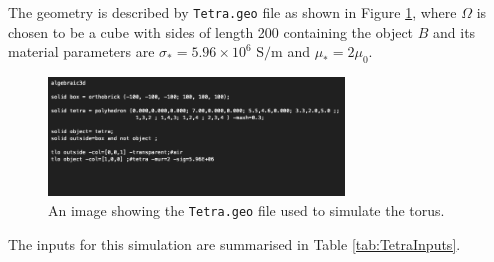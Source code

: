 The geometry is described by  \texttt{Tetra.geo} file as shown in Figure \ref{fig:Tetra.geo}, where $\Omega$ is chosen to be a cube with sides of length 200 containing the object $B$ and its material parameters are $\sigma_*=5.96\times10^6\text{ S/m}$ and $\mu_*=2\mu_0$.
\begin{figure}[H]
\begin{center}
\includegraphics[width=0.7\textwidth]{Figures/TetraInput.png}
\caption{An image showing the \texttt{Tetra.geo} file used to simulate the torus.}\label{fig:Tetra.geo}
\end{center}
\end{figure}
\noindent
The inputs for this simulation are summarised in Table \ref{tab:TetraInputs}.

